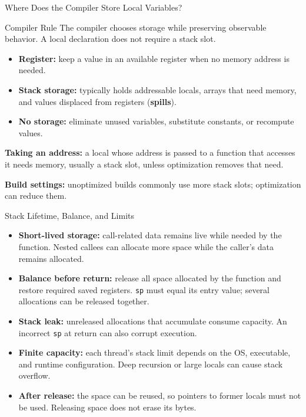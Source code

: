 \documentclass[aspectratio=169,11pt,t]{beamer}
\newcommand{\key}[1]{\textbf{#1}}
\newcommand{\bits}[1]{\texttt{#1}}
\begin{document}
\begin{frame}{Where Does the Compiler Store Local Variables?}
\small
\begin{block}{Compiler Rule}
The compiler chooses storage while preserving observable behavior. A local declaration does not require a stack slot.
\end{block}
\begin{itemize}\setlength{\itemsep}{7pt}
\item \key{Register:} keep a value in an available register when no memory address is needed.
\item \key{Stack storage:} typically holds addressable locals, arrays that need memory, and values displaced from registers (\key{spills}).
\item \key{No storage:} eliminate unused variables, substitute constants, or recompute values.
\end{itemize}
\vspace{0.15cm}
\small
\key{Taking an address:} a local whose address is passed to a function that accesses it needs memory, usually a stack slot, unless optimization removes that need.
\vspace{0.12cm}

\key{Build settings:} unoptimized builds commonly use more stack slots; optimization can reduce them.
\end{frame}

\begin{frame}{Stack Lifetime, Balance, and Limits}
\begin{itemize}\setlength{\itemsep}{7pt}
\item \key{Short-lived storage:} call-related data remains live while needed by the function. Nested callees can allocate more space while the caller's data remains allocated.
\item \key{Balance before return:} release all space allocated by the function and restore required saved registers. \bits{sp} must equal its entry value; several allocations can be released together.
\item \key{Stack leak:} unreleased allocations that accumulate consume capacity. An incorrect \bits{sp} at return can also corrupt execution.
\item \key{Finite capacity:} each thread's stack limit depends on the OS, executable, and runtime configuration. Deep recursion or large locals can cause stack overflow.
\item \key{After release:} the space can be reused, so pointers to former locals must not be used. Releasing space does not erase its bytes.
\end{itemize}
\end{frame}
\end{document}

